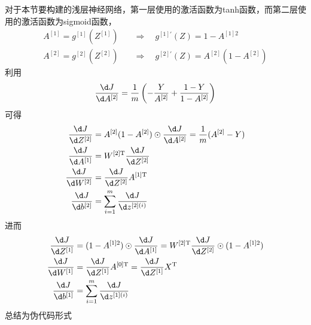 \vspace{\baselineskip}
对于本节要构建的浅层神经网络，第一层使用的激活函数为tanh函数，而第二层使用的激活函数为sigmoid函数，
\begin{align}
    A^{[1]} = g^{[1]}(Z^{[1]}) &\quad \Rightarrow \quad g^{[1]'}(Z) = 1-A^{[1]2} \\
    A^{[2]} = g^{[2]}(Z^{[2]}) &\quad \Rightarrow \quad g^{[2]'}(Z) = A^{[2]}(1-A^{[2]})
\end{align}
利用
\begin{equation}
    \frac{\d J}{\d A^{[2]}} 
    = \frac{1}{m} \left(-\frac{Y}{A^{[2]}} + \frac{1 - Y}{1 - A^{[2]}}\right)
\end{equation}
可得
\begin{align}
    \frac{\d J}{\d Z^{[2]}} &= A^{[2]}(1-A^{[2]}) \odot \frac{\d J}{\d A^{[2]}} = \frac{1}{m}(A^{[2]}-Y) \\
    \frac{\d J}{\d A^{[1]}} &= W^{[2] \mathrm{T}} \frac{\d J}{\d Z^{[2]}} \\
    \frac{\d J}{\d W^{[2]}} &= \frac{\d J}{\d Z^{[2]}} A^{[1] \mathrm{T}} \\
    \frac{\d J}{\d b^{[2]}} &= \sum_{i=1}^{m} \frac{\d J}{\d z^{[2](i)}}
\end{align}
进而
\begin{align}
    \frac{\d J}{\d Z^{[1]}} &= (1-A^{[1]2}) \odot \frac{\d J}{\d A^{[1]}} = W^{[2] \mathrm{T}} \frac{\d J}{\d Z^{[2]}} \odot (1-A^{[1]2}) \\
    \frac{\d J}{\d W^{[1]}} &= \frac{\d J}{\d Z^{[1]}} A^{[0] \mathrm{T}} = \frac{\d J}{\d Z^{[1]}} X^{\mathrm{T}} \\
    \frac{\d J}{\d b^{[1]}} &= \sum_{i=1}^{m} \frac{\d J}{\d z^{[1](i)}}
\end{align}
总结为伪代码形式
